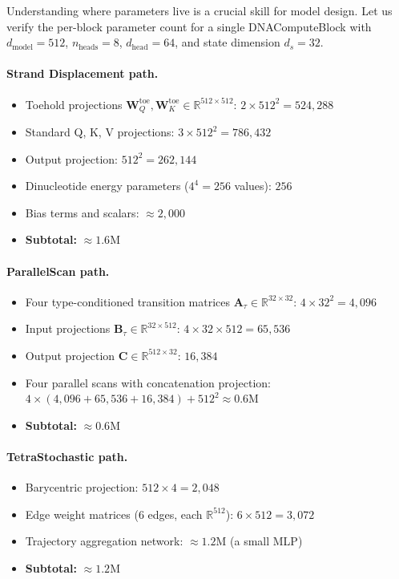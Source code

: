 Understanding where parameters live is a crucial skill for model design. Let us verify the per-block parameter count for a single DNAComputeBlock with $d_{\text{model}} = 512$, $n_{\text{heads}} = 8$, $d_{\text{head}} = 64$, and state dimension $d_s = 32$.

\paragraph{Strand Displacement path.}
\begin{itemize}[leftmargin=1.5em]
  \item Toehold projections $\mathbf{W}_Q^{\mathrm{toe}}, \mathbf{W}_K^{\mathrm{toe}} \in \mathbb{R}^{512 \times 512}$: $2 \times 512^2 = 524{,}288$
  \item Standard Q, K, V projections: $3 \times 512^2 = 786{,}432$
  \item Output projection: $512^2 = 262{,}144$
  \item Dinucleotide energy parameters ($4^4 = 256$ values): $256$
  \item Bias terms and scalars: $\approx 2{,}000$
  \item \textbf{Subtotal:} $\approx 1.6\text{M}$
\end{itemize}

\paragraph{ParallelScan path.}
\begin{itemize}[leftmargin=1.5em]
  \item Four type-conditioned transition matrices $\mathbf{A}_\tau \in \mathbb{R}^{32 \times 32}$: $4 \times 32^2 = 4{,}096$
  \item Input projections $\mathbf{B}_\tau \in \mathbb{R}^{32 \times 512}$: $4 \times 32 \times 512 = 65{,}536$
  \item Output projection $\mathbf{C} \in \mathbb{R}^{512 \times 32}$: $16{,}384$
  \item Four parallel scans with concatenation projection: $4 \times (4{,}096 + 65{,}536 + 16{,}384) + 512^2 \approx 0.6\text{M}$
  \item \textbf{Subtotal:} $\approx 0.6\text{M}$
\end{itemize}

\paragraph{TetraStochastic path.}
\begin{itemize}[leftmargin=1.5em]
  \item Barycentric projection: $512 \times 4 = 2{,}048$
  \item Edge weight matrices ($6$ edges, each $\mathbb{R}^{512}$): $6 \times 512 = 3{,}072$
  \item Trajectory aggregation network: $\approx 1.2\text{M}$ (a small MLP)
  \item \textbf{Subtotal:} $\approx 1.2\text{M}$
\end{itemize}

